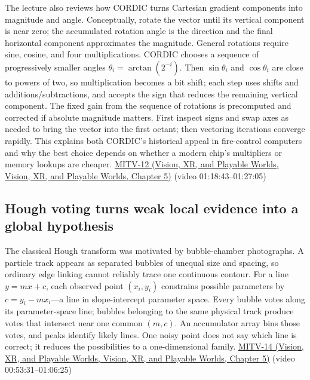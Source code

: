 The lecture also reviews how CORDIC turns Cartesian gradient components into magnitude and angle. Conceptually, rotate the vector until its vertical component is near zero; the accumulated rotation angle is the direction and the final horizontal component approximates the magnitude. General rotations require sine, cosine, and four multiplications. CORDIC chooses a sequence of progressively smaller angles \(\theta_i=\arctan(2^{-i})\). Then \(\sin\theta_i\) and \(\cos\theta_i\) are close to powers of two, so multiplication becomes a bit shift; each step uses shifts and additions/subtractions, and accepts the sign that reduces the remaining vertical component. The fixed gain from the sequence of rotations is precomputed and corrected if absolute magnitude matters. First inspect signs and swap axes as needed to bring the vector into the first octant; then vectoring iterations converge rapidly. This explains both CORDIC's historical appeal in fire-control computers and why the best choice depends on whether a modern chip's multipliers or memory lookups are cheaper. \href{../07-Vision-XR-and-Playable-Worlds/main.pdf\#nameddest=04-visual-computing-ii-ch036-mitv-12---blob-analysis-binary-image-processing-greens-theorem-derivative-and-integral}{MITV-12 (Vision, XR, and Playable Worlds, Vision, XR, and Playable Worlds, Chapter 5)} (video 01:18:43--01:27:05)

\subsection{Hough voting turns weak local evidence into a global hypothesis}\label{04-visual-computing-ii-ch030-hough-voting-turns-weak-local-evidence-into-a-global-hypothesis}

The classical Hough transform was motivated by bubble-chamber photographs. A particle track appears as separated bubbles of unequal size and spacing, so ordinary edge linking cannot reliably trace one continuous contour. For a line \(y=mx+c\), each observed point \((x_i,y_i)\) constrains possible parameters by \(c=y_i-mx_i\)---a line in slope-intercept parameter space. Every bubble votes along its parameter-space line; bubbles belonging to the same physical track produce votes that intersect near one common \((m,c)\). An accumulator array bins those votes, and peaks identify likely lines. One noisy point does not say which line is correct; it reduces the possibilities to a one-dimensional family. \href{../07-Vision-XR-and-Playable-Worlds/main.pdf\#nameddest=04-visual-computing-ii-ch036-mitv-14---inspection-in-patquick-hough-transform-homography-position-determination-multi-scale}{MITV-14 (Vision, XR, and Playable Worlds, Vision, XR, and Playable Worlds, Chapter 5)} (video 00:53:31--01:06:25)

